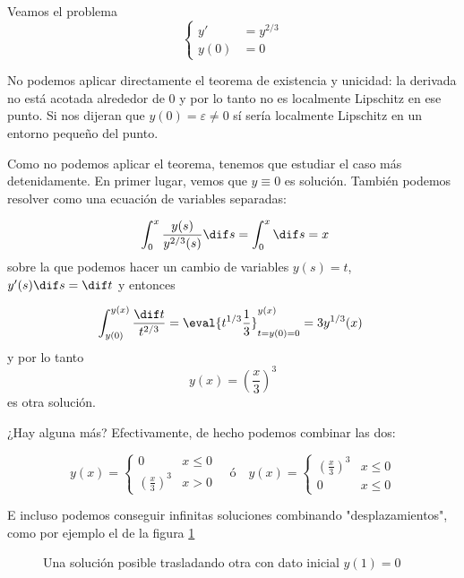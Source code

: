 \documentclass[nochap]{apuntes}
\begin{document}
\begin{example}
Veamos el problema \[ \begin{cases} y' &= y^{2/3} \\ y(0) &= 0 \end{cases} \]

No podemos aplicar directamente el teorema de existencia y unicidad: la derivada no está acotada alrededor de 0 y por lo tanto no es localmente Lipschitz en ese punto. Si nos dijeran que $y(0) = ε ≠ 0$ sí sería localmente Lipschitz en un entorno pequeño del punto.

Como no podemos aplicar el teorema, tenemos que estudiar el caso más detenidamente. En primer lugar, vemos que $y\equiv 0$ es solución. También podemos resolver como una ecuación de variables separadas:

\[ \int_0^x \frac{y(s)}{y^{2/3}(s)} \dif s = \int_0^x \dif s = x \] sobre la que podemos hacer un cambio de variables $y(s) = t$, $y'(s) \dif s = \dif t$ y entonces

\[ \int_{y(0)}^{y(x)} \frac{\dif t}{t^{2/3}} = \eval{t^{1/3}{\frac{1}{3}}}_{t=y(0)=0}^{y(x)} = 3y^{1/3}(x) 
\] 
y por lo tanto \[ y(x) = \left(\frac{x}{3}\right)^3 \] es otra solución.

¿Hay alguna más? Efectivamente, de hecho podemos combinar las dos:

\[ y(x) = \begin{cases}
0 & x ≤ 0 \\
\left(\frac{x}{3}\right)^3 & x > 0
\end{cases}\quad \text{\'o} \quad y(x) = \begin{cases}
\left(\frac{x}{3}\right)^3 & x ≤ 0 \\
0 & x ≤ 0\end{cases} \]

E incluso podemos conseguir infinitas soluciones combinando "desplazamientos", como por ejemplo el de la figura \ref{imgInfSoluciones}

\begin{figure}[hbtp]
\centering
{}
\label{imgInfSoluciones}
\caption{Una solución posible trasladando otra con dato inicial $y(1) = 0$}
\end{figure}
\end{example}
\end{document}
